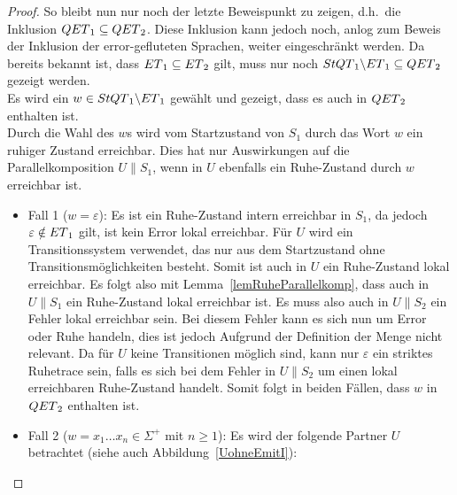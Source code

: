 \begin{proof}
  So bleibt nun nur noch der letzte Beweispunkt zu zeigen, d.h.\ die Inklusion
  $QET{}_1\subseteq QET{}_2$. Diese Inklusion kann jedoch noch, anlog zum Beweis
  der Inklusion der error-gefluteten Sprachen, weiter eingeschränkt werden.
  Da bereits bekannt ist, dass $ET{}_1\subseteq ET{}_2$ gilt, muss nur
  noch $StQT{}_1\backslash ET{}_1\subseteq QET{}_2$ gezeigt werden.\\
  Es wird ein $w\in StQT{}_1\backslash ET{}_1$ gewählt und gezeigt, dass
  es auch in $QET{}_2$ enthalten ist.\\
  Durch die Wahl des $w$s wird vom Startzustand von $S_1$ durch das Wort $w$
  ein ruhiger Zustand erreichbar. Dies hat nur Auswirkungen auf die
  Parallelkomposition $U\|S_1$, wenn in $U$ ebenfalls ein Ruhe-Zustand durch
  $w$ erreichbar ist.
  \begin{itemize}
    \item Fall 1 ($w=\varepsilon$): Es ist ein Ruhe-Zustand intern erreichbar in
      $S_1$, da jedoch $\varepsilon\notin ET{}_1$ gilt, ist kein Error
      lokal erreichbar. Für $U$ wird ein Transitionssystem verwendet, das nur
      aus dem Startzustand ohne Transitionsmöglichkeiten besteht. Somit ist
      auch in $U$ ein Ruhe-Zustand lokal erreichbar. Es
      folgt also mit Lemma~\ref{lemRuheParallelkomp}, dass auch in $U\|S_1$ ein
      Ruhe-Zustand lokal erreichbar ist. Es muss also auch in
      $U\|S_2$ ein Fehler lokal erreichbar sein. Bei diesem Fehler kann es sich
      nun um Error oder Ruhe handeln, dies ist jedoch
      Aufgrund der Definition der Menge \QT{} nicht relevant. Da für $U$ keine
      Transitionen möglich sind, kann nur $\varepsilon$ ein striktes
      Ruhetrace sein, falls es sich bei dem Fehler in $U\|S_2$ um einen lokal
      erreichbaren Ruhe-Zustand handelt. Somit folgt in
      beiden Fällen, dass $w$ in $QET{}_2$ enthalten ist.
    \item Fall 2 ($w=x_1\dots x_n\in \Sigma ^+$ mit $n\geq 1$): Es wird der
      folgende Partner $U$ betrachtet (siehe auch Abbildung~\ref{UohneEmitI}):
\end{itemize}
\end{proof}
